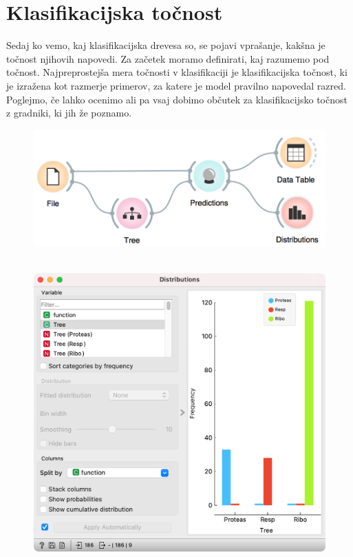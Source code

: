\chapter{Klasifikacijska točnost}
\label{ch:klasifikacijska-tocnost}

Sedaj ko vemo, kaj klasifikacijska drevesa so, se pojavi vprašanje, kakšna je točnost njihovih napovedi. Za začetek moramo definirati, kaj razumemo pod točnost. Najpreprostejša mera točnosti v klasifikaciji je klasifikacijska točnost, ki je izražena kot razmerje primerov, za katere je model pravilno napovedal razred. Poglejmo, če lahko ocenimo ali pa vsaj dobimo občutek za klasifikacijsko točnost z gradniki, ki jih že poznamo.

\begin{figure}[h]
    \includegraphics[width=0.9\linewidth]{workflow1.png}
    \caption{$\;$}
\end{figure}

\begin{figure}
    \includegraphics[scale=0.5]{distributions.png}
    \caption{$\;$}
\end{figure}

